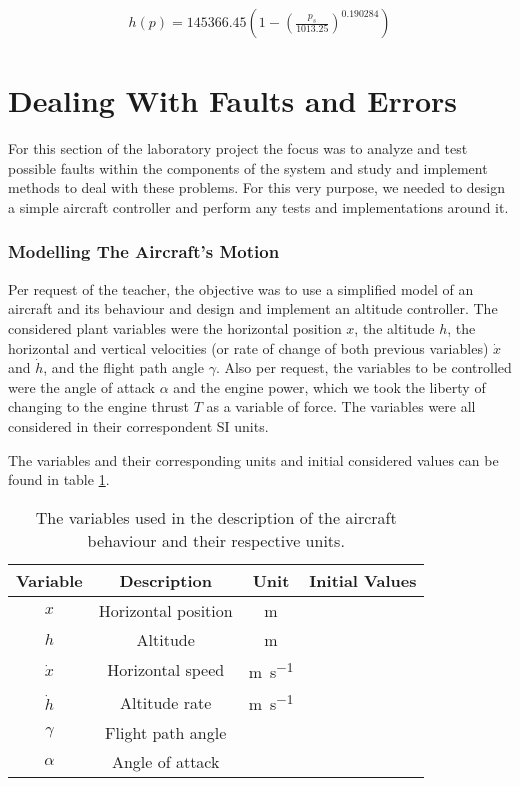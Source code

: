 \documentclass[english,palatino]{ist-report}
\begin{document}
\begin{gather*}
	h(p) = 145366.45\left(1 - \left(\frac{p_s}{1013.25}\right)^{0.190284}\right)
\end{gather*}

\pagebreak
\part{Dealing With Faults and Errors}

For this section of the laboratory project the focus was to analyze and test possible faults within the components of the system and study and implement methods to deal with these problems. For this very purpose, we needed to design a simple aircraft controller and perform any tests and implementations around it.

\section{Modelling The Aircraft's Motion}\label{sec:plant}

Per request of the teacher, the objective was to use a simplified model of an aircraft and its behaviour and design and implement an altitude controller. The considered plant variables were the horizontal position $x$, the altitude $h$, the horizontal and vertical velocities (or rate of change of both previous variables) $\dot{x}$ and $\dot{h}$, and the flight path angle $\gamma$. Also per request, the variables to be controlled were the angle of attack $\alpha$ and the engine power, which we took the liberty of changing to the engine thrust $T$ as a variable of force. The variables were all considered in their correspondent SI units.

The variables and their corresponding units and initial considered values can be found in table \ref{tab:controllervars}.
\begin{table}[ht]
	\centering
	\begin{tabular}{c|c|c|c}\toprule
		Variable		& Description			& Unit						& Initial Values	\\
		\midrule
		$x$				& Horizontal position	& \si{\meter}				&					\\
		$h$				& Altitude				& \si{\meter}				&					\\
		$\dot{x}$		& Horizontal speed		& \si{\meter\per\second}	&					\\
		$\dot{h}$		& Altitude rate			& \si{\meter\per\second}	&					\\
		$\gamma$		& Flight path angle		& 							&					\\
		$\alpha$		& Angle of attack		& 							&					\\
		\bottomrule
	\end{tabular}
	\caption{The variables used in the description of the aircraft behaviour and their respective units.}
	\label{tab:controllervars}
\end{table}
\end{document}
